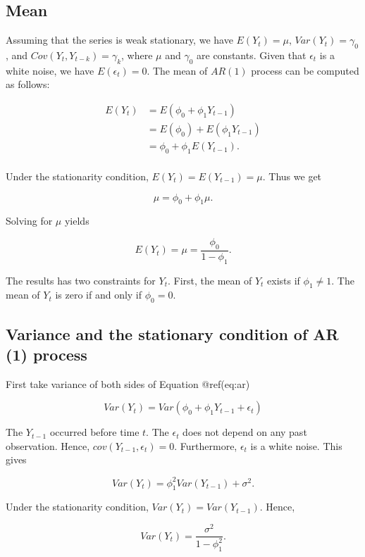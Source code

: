 \documentclass[
  11pt,
  a4paper,
]{report}
\begin{document}
\subsection{Mean}\label{mean}

Assuming that the series is weak stationary, we have \(E(Y_t)=\mu\),
\(Var(Y_t)=\gamma_0\), and \(Cov(Y_t, Y_{t-k})=\gamma_k\), where \(\mu\)
and \(\gamma_0\) are constants. Given that \({\epsilon_t}\) is a white
noise, we have \(E(\epsilon_t)=0\). The mean of \(AR(1)\) process can be
computed as follows:

\[
\begin{aligned}
  E(Y_t) &= E(\phi_0+\phi_1 Y_{t-1}) \\
         &= E(\phi_0) +E(\phi_1 Y_{t-1}) \\
         &= \phi_0 +\phi_1 E(Y_{t-1}). \\
\end{aligned}
\]

Under the stationarity condition, \(E(Y_t)=E(Y_{t-1})=\mu\). Thus we get

\[\mu = \phi_0+\phi_1\mu.\]

Solving for \(\mu\) yields

\begin{equation}
E(Y_t)=\mu=\frac{\phi_0}{1-\phi_1}.
\end{equation}

The results has two constraints for \(Y_t\). First, the mean of \(Y_t\)
exists if \(\phi_1 \neq 1 .\) The mean of \(Y_t\) is zero if and only if
\(\phi_0=0\).

\subsection{Variance and the stationary condition of AR (1)
process}\label{variance-and-the-stationary-condition-of-ar-1-process}

First take variance of both sides of Equation @ref(eq:ar)

\[Var(Y_t)=Var(\phi_0+\phi_1 Y_{t-1}+\epsilon_t)\]

The \(Y_{t-1}\) occurred before time \(t\). The \(\epsilon_t\) does not
depend on any past observation. Hence, \(cov(Y_{t-1}, \epsilon_t)= 0\).
Furthermore, \({\epsilon_t}\) is a white noise. This gives

\[Var(Y_t)=\phi_1^2 Var(Y_{t-1})+\sigma^2.\]

Under the stationarity condition, \(Var(Y_t)=Var(Y_{t-1})\). Hence,

\[Var(Y_t)=\frac{\sigma^2}{1-\phi_1^2}.\]
\end{document}
